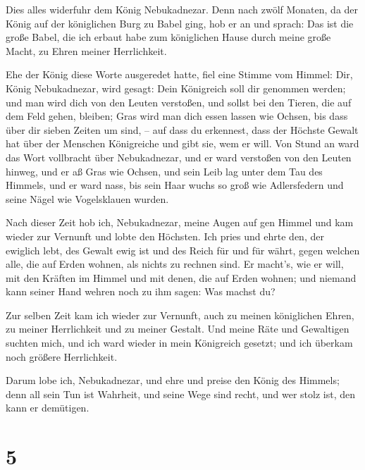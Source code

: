  Dies alles widerfuhr dem König Nebukadnezar.
 Denn nach zwölf Monaten, da der König auf der
königlichen Burg zu Babel ging,  hob er an und sprach:
Das ist die große Babel, die ich erbaut habe zum königlichen Hause durch
meine große Macht, zu Ehren meiner Herrlichkeit.

 Ehe der König diese Worte ausgeredet hatte, fiel eine
Stimme vom Himmel: Dir, König Nebukadnezar, wird gesagt: Dein Königreich
soll dir genommen werden;  und man wird dich von den
Leuten verstoßen, und sollst bei den Tieren, die auf dem Feld gehen,
bleiben; Gras wird man dich essen lassen wie Ochsen, bis dass über dir
sieben Zeiten um sind, -- auf dass du erkennest, dass der Höchste Gewalt
hat über der Menschen Königreiche und gibt sie, wem er will.
 Von Stund an ward das Wort vollbracht über Nebukadnezar,
und er ward verstoßen von den Leuten hinweg, und er aß Gras wie Ochsen,
und sein Leib lag unter dem Tau des Himmels, und er ward nass, bis sein
Haar wuchs so groß wie Adlersfedern und seine Nägel wie Vogelsklauen
wurden.

 Nach dieser Zeit hob ich, Nebukadnezar, meine Augen auf
gen Himmel und kam wieder zur Vernunft und lobte den Höchsten. Ich pries
und ehrte den, der ewiglich lebt, des Gewalt ewig ist und des Reich für
und für währt,  gegen welchen alle, die auf Erden wohnen,
als nichts zu rechnen sind. Er macht's, wie er will, mit den Kräften im
Himmel und mit denen, die auf Erden wohnen; und niemand kann seiner Hand
wehren noch zu ihm sagen: Was machst du?

 Zur selben Zeit kam ich wieder zur Vernunft, auch zu
meinen königlichen Ehren, zu meiner Herrlichkeit und zu meiner Gestalt.
Und meine Räte und Gewaltigen suchten mich, und ich ward wieder in mein
Königreich gesetzt; und ich überkam noch größere Herrlichkeit.

 Darum lobe ich, Nebukadnezar, und ehre und preise den
König des Himmels; denn all sein Tun ist Wahrheit, und seine Wege sind
recht, und wer stolz ist, den kann er demütigen.

\hypertarget{section-4}{%
\section{5}\label{section-4}}

